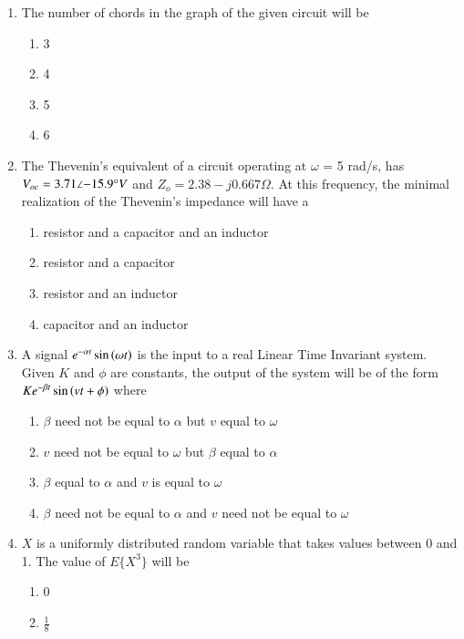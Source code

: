 \documentclass[journal]{IEEEtran}
\begin{document}
\begin{enumerate}
\item The number of chords in the graph of the given circuit will be
\begin{figure}[!ht]
\centering
\resizebox{0.5\textwidth}{!}{%

}%
\end{figure}
    \begin{enumerate}
        \item 3
        \item 4
        \item 5
        \item 6 \\
    \end{enumerate}
\item The Thevenin's equivalent of a circuit operating at $\omega$ = 5 rad/s, has $V_{oc} = 3.71\angle{-15.9\degree} V$ and $Z_o = 2.38 - j0.667\Omega$. At this frequency, the minimal realization of the Thevenin's impedance will have a
\begin{enumerate}
    \item resistor and a capacitor and an inductor
    \item resistor and a capacitor
    \item resistor and an inductor
    \item capacitor and an inductor
\end{enumerate}
\item A signal $e^{-\alpha t}\sin\left(\omega t\right)$ is the input to a real Linear Time Invariant system. Given $K$ and $\phi$ are constants, the output of the system will be of the form $Ke^{-\beta t}\sin\left(vt+\phi\right)$ where
\begin{enumerate}
    \item $\beta$ need not be equal to $\alpha$ but $v$ equal to $\omega$
    \item $v$ need not be equal to $\omega$ but $\beta$ equal to $\alpha$
    \item $\beta$ equal to $\alpha$ and $v$ is equal to $\omega$
    \item $\beta$ need not be equal to $\alpha$ and $v$ need not be equal to $\omega$ \\
\end{enumerate}
\item $X$ is a uniformly distributed random variable that takes values between 0 and 1. The value of $E\{X^3\}$ will be
 \begin{enumerate}
     \item 0
     \item $\frac{1}{8}$

\end{enumerate}
\end{enumerate}
\end{document}

